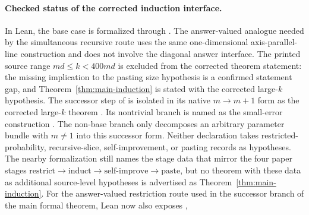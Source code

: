 \paragraph{Checked status of the corrected induction interface.}
	In Lean, the base case is formalized through
	.
	The answer-valued analogue needed by the simultaneous recursive route uses
	the same one-dimensional axis-parallel-line construction and does not involve
	the diagonal answer interface.
	The printed source range \(md\le k<400md\) is excluded from the corrected
	theorem statement: the missing implication to the pasting size hypothesis is
	a confirmed statement gap, and Theorem~\ref{thm:main-induction} is stated
	with the corrected large-\(k\) hypothesis.  The successor step of
	 is isolated in its
	native \(m\to m+1\) form as the corrected large-\(k\) theorem
	.  Its
	nontrivial branch is named as the small-error construction
	.
	The
	non-base branch
	 only decomposes
	an arbitrary parameter bundle with \(m\ne1\) into this successor form.  Neither
	declaration takes restricted-probability, recursive-slice, self-improvement, or
	pasting records as hypotheses.  The nearby formalization still names the stage data
	that mirror the four paper stages $\text{restrict} \to \text{induct} \to
	\text{self-improve} \to \text{paste}$, but no theorem with these data as
	additional source-level hypotheses is advertised as
	Theorem~\ref{thm:main-induction}. For the answer-valued restriction route
	used in the successor branch of the main formal theorem, Lean now also exposes
	,
